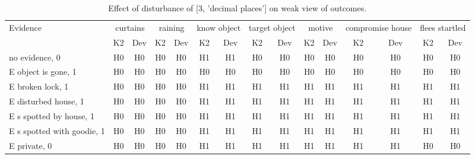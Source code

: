 \begin{table}\begin{tabular}{l|cc|cc|cc|cc|cc|cc|cc}\toprule\multirow{2}{*}{Evidence} & \multicolumn{2}{c}{curtains}& \multicolumn{2}{c}{raining}& \multicolumn{2}{c}{know object}& \multicolumn{2}{c}{target object}& \multicolumn{2}{c}{motive}& \multicolumn{2}{c}{compromise house}& \multicolumn{2}{c}{flees startled}\\& {K2} & {Dev}& {K2} & {Dev}& {K2} & {Dev}& {K2} & {Dev}& {K2} & {Dev}& {K2} & {Dev}& {K2} & {Dev}\\\midrule
no evidence, 0 & H0&H0&H0&H0&H1&H1&H0&H0&H0&H0&H0&H0&H0&H0\\E object is gone, 1 & H0&H0&H0&H0&H0&H0&H0&H0&H0&H0&H0&H0&H0&H0\\E broken lock, 1 & H0&H0&H0&H0&H1&H1&H1&H1&H1&H1&H1&H1&H1&H1\\E disturbed house, 1 & H0&H0&H0&H0&H1&H1&H1&H1&H1&H1&H1&H1&H1&H1\\E s spotted by house, 1 & H0&H0&H0&H0&H1&H1&H1&H1&H1&H1&H1&H1&H1&H1\\E s spotted with goodie, 1 & H0&H0&H0&H0&H1&H1&H1&H1&H1&H1&H1&H1&H1&H1\\E private, 0 & H0&H0&H0&H0&H1&H1&H1&H1&H1&H1&H1&H1&H0&H0\\\bottomrule\end{tabular}\caption{Effect of disturbance of [3, 'decimal places'] on weak view of outcomes.}\end{table}